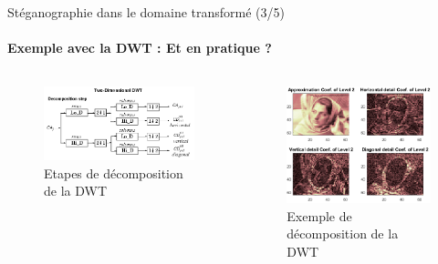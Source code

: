 \documentclass{beamer}
\begin{document}
	\begin{frame}{Stéganographie dans le domaine transformé (3/5)}
		\framesubtitle{Exemple avec la DWT : Et en pratique ?}
		\begin{columns}[c]
			\begin{column}{.45\linewidth}
			\begin{figure}[h]
				\centering
				\includegraphics[width=\linewidth]{images/dwt2-decomposition-step.png}
				\caption*{Etapes de décomposition de la DWT}
			\end{figure}
			\end{column}
		
			\begin{column}{.45\linewidth}
			\begin{figure}[h]
				\centering
				\includegraphics[width=\linewidth]{images/decompo-example.png}
				\caption*{Exemple de décomposition de la DWT}
			\end{figure}
			\end{column}
		\end{columns}
	\end{frame}
\end{document}
